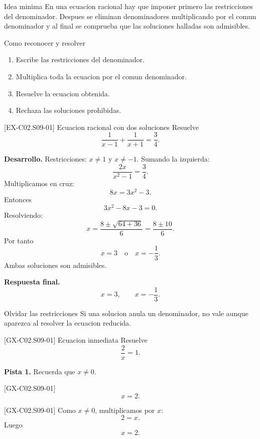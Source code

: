 \begin{theorybox}{Idea minima}
En una ecuacion racional hay que imponer primero las restricciones del denominador. Despues se
eliminan denominadores multiplicando por el comun denominador y al final se comprueba que las
soluciones halladas son admisibles.
\end{theorybox}

\begin{methodbox}{Como reconocer y resolver}
\begin{enumerate}
  \item Escribe las restricciones del denominador.
  \item Multiplica toda la ecuacion por el comun denominador.
  \item Resuelve la ecuacion obtenida.
  \item Rechaza las soluciones prohibidas.
\end{enumerate}
\end{methodbox}

\begin{solvedexample}{[EX-C02.S09-01] Ecuacion racional con dos soluciones}
Resuelve
\[
\frac{1}{x-1}+\frac{1}{x+1}=\frac{3}{4}.
\]

\textbf{Desarrollo.} Restricciones: \(x\neq 1\) y \(x\neq -1\). Sumando la izquierda:
\[
\frac{2x}{x^2-1}=\frac{3}{4}.
\]
Multiplicamos en cruz:
\[
8x=3x^2-3.
\]
Entonces
\[
3x^2-8x-3=0.
\]
Resolviendo:
\[
x=\frac{8\pm \sqrt{64+36}}{6}=\frac{8\pm 10}{6}.
\]
Por tanto
\[
x=3 \quad \text{o} \quad x=-\frac{1}{3}.
\]
Ambas soluciones son admisibles.

\textbf{Respuesta final.}
\[
x=3,\qquad x=-\frac{1}{3}.
\]
\end{solvedexample}

\begin{commonerror}{Olvidar las restricciones}
Si una solucion anula un denominador, no vale aunque aparezca al resolver la ecuacion reducida.
\end{commonerror}

\begin{guidedexercise}{[GX-C02.S09-01] Ecuacion inmediata}
Resuelve
\[
\frac{2}{x}=1.
\]

\textbf{Pista 1.} Recuerda que \(x\neq 0\).
\end{guidedexercise}

\begin{shortanswer}{[GX-C02.S09-01]}
\[
x=2.
\]
\end{shortanswer}

\begin{fullsolution}{[GX-C02.S09-01]}
Como \(x\neq 0\), multiplicamos por \(x\):
\[
2=x.
\]
Luego
\[
x=2.
\]
\end{fullsolution}

